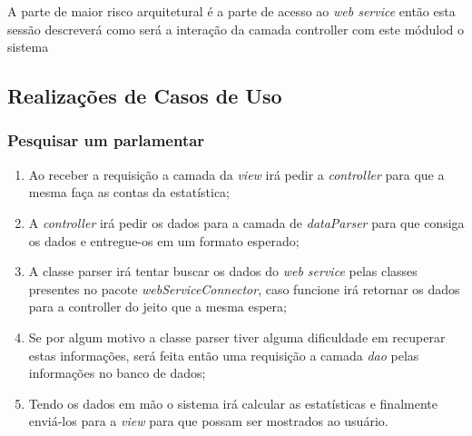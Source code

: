 A parte de maior risco arquitetural é a parte de acesso ao \textit{web service} então esta sessão descreverá como será a interação da camada controller com este módulod o sistema

\subsection{Realizações de Casos de Uso}
	
	\subsubsection{Pesquisar um parlamentar}

		\begin{enumerate}
			\item Ao receber a requisição a camada da \textit{view} irá pedir a \textit{controller} para que a mesma faça as contas da estatística;

			\item A \textit{controller} irá pedir os dados para a camada de \textit{dataParser} para que consiga os dados e entregue-os em um formato esperado;

			\item A classe parser irá tentar buscar os dados do \textit{web service} pelas classes presentes no pacote \textit{webServiceConnector}, caso funcione irá retornar os dados para a controller do jeito que a mesma espera;

			\item Se por algum motivo a classe parser tiver alguma dificuldade em recuperar estas informações, será feita então uma requisição a camada \textit{dao} pelas informações no banco de dados;

			\item Tendo os dados em mão o sistema irá calcular as estatísticas e finalmente enviá-los para a \textit{view} para que possam ser mostrados ao usuário.
		\end{enumerate}